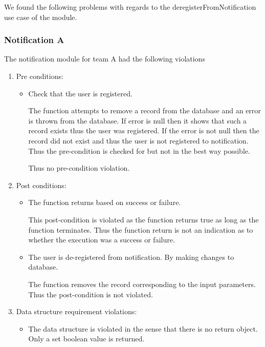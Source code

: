 
We found the following problems with regards to the deregisterFromNotification use case of the module.
\subsubsection*{Notification A}
The notification module for team A had the following violations
\begin{enumerate}
	\item Pre conditions:
	\begin{itemize}
		\item Check that the user is registered.
		
		 The function attempts to remove a record from the database and an error is thrown from the database. If error is null then it shows that such a record exists thus the user was registered. If the error is not null then the record did not exist and thus the user is not registered to notification. Thus the pre-condition is checked for but not in the best way possible. 
		 
		 Thus no pre-condition violation.
	\end{itemize}
	\item Post conditions:
	\begin{itemize}
		\item The function returns based on success or failure.
		
		This post-condition is violated as the function returns true as long as the function terminates. Thus the function return is not an indication as to whether the execution was a success or failure.
		
		\item The user is de-registered from notification. By making changes to database.
		
		The function removes the record corresponding to the input parameters. Thus the post-condition is not violated.	
		
		
	\end{itemize}
	\item Data structure requirement violations:
	\begin{itemize}
		\item 		The data structure is violated in the sense that there is no return object. Only a set boolean value is returned.

	\end{itemize}
\end{enumerate}
